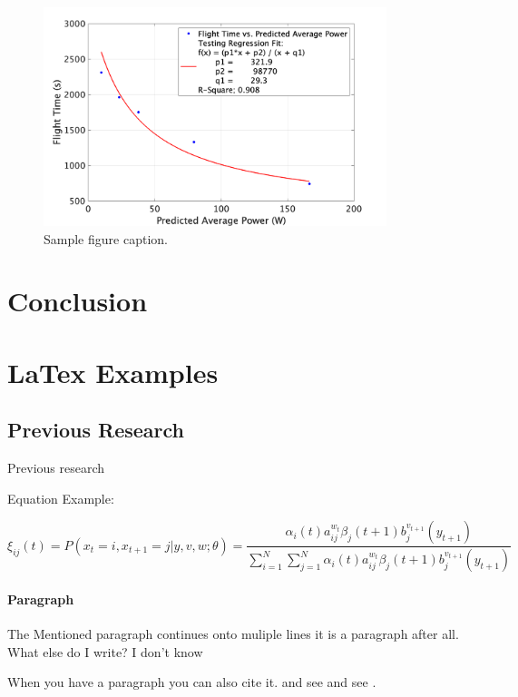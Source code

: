\documentclass{article}
\begin{document}
\begin{figure}
  \centering
  \includegraphics[width = 100mm]{images/UsingPredictedPower.png}
  \caption{Sample figure caption.}
  \label{fig:fig1}
\end{figure}



\section{Conclusion}




\section{LaTex Examples}
\label{sec:headings}

\subsection{Previous Research}
Previous research \par
Equation Example: \newline

\begin{equation}
\xi _{ij}(t)=P(x_{t}=i,x_{t+1}=j|y,v,w;\theta)= {\frac {\alpha _{i}(t)a^{w_t}_{ij}\beta _{j}(t+1)b^{v_{t+1}}_{j}(y_{t+1})}{\sum _{i=1}^{N} \sum _{j=1}^{N} \alpha _{i}(t)a^{w_t}_{ij}\beta _{j}(t+1)b^{v_{t+1}}_{j}(y_{t+1})}}
\end{equation}


\paragraph{Paragraph}
The Mentioned paragraph continues onto muliple lines it is a paragraph after all. What else do I write? I don't know


\label{sec:others}
When you have a paragraph you can also cite it. \cite{Prasetia} and see \cite{Chen} and see \cite{Corral}.
\end{document}
